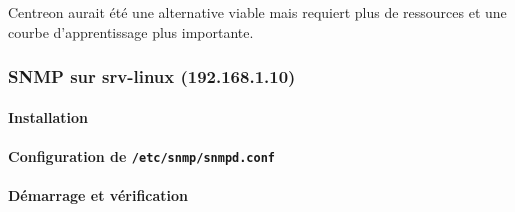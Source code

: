 Centreon aurait été une alternative viable mais requiert plus de
ressources et une courbe d'apprentissage plus importante.

\subsubsection{SNMP sur srv-linux
(192.168.1.10)}\label{snmp-sur-srv-linux-192.168.1.10}

\paragraph{Installation}\label{installation}

\begin{Shaded}
\begin{Highlighting}[]
\end{Highlighting}
\end{Shaded}

\paragraph{\texorpdfstring{Configuration de
\texttt{/etc/snmp/snmpd.conf}}{Configuration de /etc/snmp/snmpd.conf}}\label{configuration-de-etcsnmpsnmpd.conf}

\begin{Shaded}
\begin{Highlighting}[]
\KeywordTok{[::1]}


\end{Highlighting}
\end{Shaded}

\paragraph{Démarrage et
vérification}\label{duxe9marrage-et-vuxe9rification}

\begin{Shaded}
\begin{Highlighting}[]
 \KeywordTok{|} 
\end{Highlighting}
\end{Shaded}

